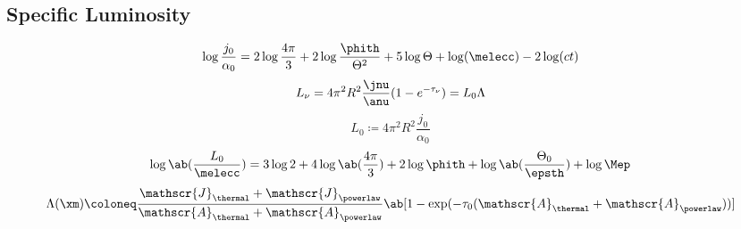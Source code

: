 \subsection{Specific Luminosity}
\begin{equation}
  \log\frac{j_0}{\alpha_0}
  =
  2\log\frac{4\pi}{3}
  + 2\log\frac{\phith}{\Theta^2}
  + 5\log{\Theta}
  +\log(\melecc)
  -2\log(ct)
\end{equation}
\begin{equation}
  L_{\nu}
  =
  4\pi^2 R^2
  \frac{\jnu}{\anu}
  (1-e^{-\tau_{\nu}})
  =
  L_0 \Lambda
\end{equation}
\begin{equation}
  L_0
  \coloneq
  4\pi^2 R^2
  \frac{j_0}{\alpha_0}
\end{equation}
\begin{equation}
  \log\ab(\frac{L_0}{\melecc})
  =
  3\log{2} + 4\log\ab(\frac{4\pi}{3})
  +2\log{\phith}
  +\log\ab(\frac{\Theta_0}{\epsth})
  +\log{\Mep}
\end{equation}
\begin{equation}
  \Lambda(\xm)
  \coloneq
  \frac{
    \mathscr{J}_{\thermal}
    +
    \mathscr{J}_{\powerlaw}
  }{
    \mathscr{A}_{\thermal}
    +
    \mathscr{A}_{\powerlaw}
  }
  \ab[1-\exp(
    -\tau_0(
    \mathscr{A}_{\thermal}
    +
    \mathscr{A}_{\powerlaw}
    )
  )]
\end{equation}


